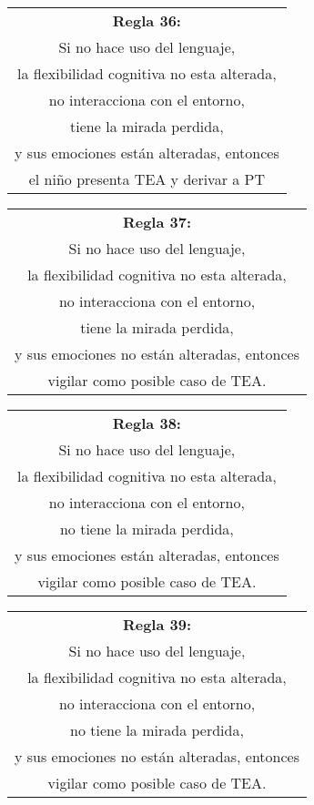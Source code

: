 \documentclass[letterpaper,12pt]{article}
\begin{document}
\begin{center}
	\begin{tabular}{|c|}
		\hline 
		\textbf{Regla 36:} \\
		Si no hace uso del lenguaje,\\
		la flexibilidad cognitiva no esta alterada,\\
		no interacciona con el entorno,\\
		tiene la mirada perdida,\\
		y sus emociones están alteradas, entonces\\
		el niño presenta TEA y derivar a PT\\
\hline 
\end{tabular} 
\end{center}		
		
\begin{center}
	\begin{tabular}{|c|}
		\hline 
		\textbf{Regla 37:} \\
		Si no hace uso del lenguaje,\\
		la flexibilidad cognitiva no esta alterada,\\
		no interacciona con el entorno,\\
		tiene la mirada perdida,\\
		y sus emociones no están alteradas, entonces\\
		vigilar como posible caso de TEA.\\
\hline 
\end{tabular} 
\end{center}		
		
\begin{center}
	\begin{tabular}{|c|}
		\hline 
		\textbf{Regla 38:} \\
		Si no hace uso del lenguaje,\\
		la flexibilidad cognitiva no esta alterada,\\
		no interacciona con el entorno,\\
		no tiene la mirada perdida,\\
		y sus emociones están alteradas, entonces\\
		vigilar como posible caso de TEA.\\
\hline 
\end{tabular} 
\end{center}		
		
\begin{center}
	\begin{tabular}{|c|}
		\hline 
		\textbf{Regla 39:} \\
		Si no hace uso del lenguaje,\\
		la flexibilidad cognitiva no esta alterada,\\
		no interacciona con el entorno,\\
		no tiene la mirada perdida,\\
		y sus emociones no están alteradas, entonces\\
		vigilar como posible caso de TEA.\\
\hline 
\end{tabular} 
\end{center}		
		
\end{document}
